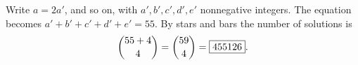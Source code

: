 Write $a=2a'$, and so on, with $a',b',c',d',e'$ nonnegative integers. The equation becomes $a'+b'+c'+d'+e'=55$. By stars and bars the number of solutions is
\[\dbinom{55+4}{4}=\dbinom{59}{4}=\boxed{455126}.\]
